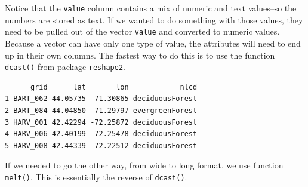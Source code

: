 \documentclass[
  13,
  letterpaper,
]{report}
\newenvironment{Shaded}{\begin{snugshade}}{\end{snugshade}}
\newcommand{\FunctionTok}[1]{\textcolor[rgb]{0.28,0.35,0.67}{#1}}
\newcommand{\NormalTok}[1]{\textcolor[rgb]{0.00,0.23,0.31}{#1}}
\newcommand{\OtherTok}[1]{\textcolor[rgb]{0.00,0.23,0.31}{#1}}
\newcommand{\SpecialCharTok}[1]{\textcolor[rgb]{0.37,0.37,0.37}{#1}}
\begin{document}
Notice that the \texttt{value} column contains a mix of numeric and text
values--so the numbers are stored as text. If we wanted to do something
with those values, they need to be pulled out of the vector
\texttt{value} and converted to numeric values. Because a vector can
have only one type of value, the attributes will need to end up in their
own columns. The fastest way to do this is to use the function
\texttt{dcast()} from package \texttt{reshape2}.

\begin{Shaded}
\end{Shaded}

\begin{verbatim}
      grid      lat       lon            nlcd
1 BART_062 44.05735 -71.30865 deciduousForest
2 BART_084 44.04850 -71.29797 evergreenForest
3 HARV_001 42.42294 -72.25872 deciduousForest
4 HARV_006 42.40199 -72.25478 deciduousForest
5 HARV_008 42.44339 -72.22512 deciduousForest
\end{verbatim}

If we needed to go the other way, from wide to long format, we use
function \texttt{melt()}. This is essentially the reverse of
\texttt{dcast()}.
\end{document}
